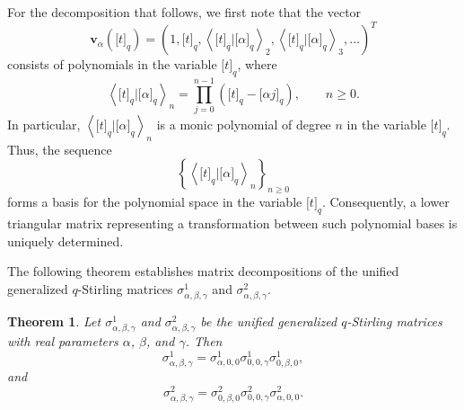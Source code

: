 \documentclass[12pt]{article}
\newtheorem{thm}{Theorem}[section]
\def\v{\mathbf{v}}
\begin{document}
For the decomposition that follows, we first note that the vector
\[
\v_{\alpha}\left(\big[t\big]_q\right)
=
\left(
1,\big[t\big]_q,
\left\langle \big[t\big]_q|\big[\alpha\big]_q\right\rangle_2,
\left\langle \big[t\big]_q|\big[\alpha\big]_q\right\rangle_3,
\ldots
\right)^T
\]
consists of polynomials in the variable $\big[t\big]_q$, where
\[
\left\langle \big[t\big]_q|\big[\alpha\big]_q\right\rangle_n
=
\prod_{j=0}^{n-1}
\left(\big[t\big]_q-\big[\alpha j\big]_q\right),
\qquad n\geq 0.
\]
In particular, $\left\langle \big[t\big]_q|\big[\alpha\big]_q\right\rangle_n$
is a monic polynomial of degree $n$ in the variable $\big[t\big]_q$.
Thus, the sequence
\[
\left\{
\left\langle \big[t\big]_q|\big[\alpha\big]_q\right\rangle_n
\right\}_{n\geq0}
\]
forms a basis for the polynomial space in the variable $\big[t\big]_q$.
Consequently, a lower triangular matrix representing a transformation
between such polynomial bases is uniquely determined.

The following theorem establishes matrix decompositions of the unified generalized $q$-Stirling matrices $\sigma^1_{\alpha,\beta,\gamma}$ and $\sigma^2_{\alpha,\beta,\gamma}$.

\begin{thm}\label{thm6}
	Let $\sigma^1_{\alpha,\beta,\gamma}$ and $\sigma^2_{\alpha,\beta,\gamma}$ be the unified generalized $q$-Stirling matrices with real parameters $\alpha$, $\beta$, and $\gamma$. Then
	\begin{equation}
		\sigma^1_{\alpha,\beta,\gamma}=\sigma^1_{\alpha,0,0}\sigma^1_{0,0,\gamma}\sigma^1_{0,\beta,0},\label{finalresult1}
	\end{equation}
	and
	\begin{equation}
		\sigma^2_{\alpha,\beta,\gamma}=\sigma^2_{0,\beta,0}\sigma^2_{0,0,\gamma}\sigma^2_{\alpha,0,0}.\label{finalresult2}
	\end{equation}
\end{thm}
\end{document}
